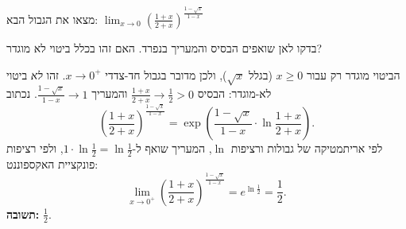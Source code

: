 
\begin{question}
מצאו את הגבול הבא:
$\displaystyle\lim_{x\to0}\left(\frac{1+x}{2+x}\right)^{\frac{1-\sqrt{x}}{1-x}}$
\end{question}

\begin{hint}
בדקו לאן שואפים הבסיס והמעריך בנפרד. האם זהו בכלל ביטוי לא מוגדר?
\end{hint}

\begin{solution}
הביטוי מוגדר רק עבור $x\ge0$ (בגלל $\sqrt x$), ולכן מדובר בגבול חד-צדדי $x\to0^+$.
זהו \emph{לא} ביטוי לא-מוגדר: הבסיס $\frac{1+x}{2+x}\to\frac12>0$ והמעריך $\frac{1-\sqrt x}{1-x}\to1$. נכתוב
\[
\left(\frac{1+x}{2+x}\right)^{\frac{1-\sqrt{x}}{1-x}}=\exp\left(\frac{1-\sqrt{x}}{1-x}\cdot\ln\frac{1+x}{2+x}\right).
\]
לפי אריתמטיקה של גבולות ורציפות $\ln$, המעריך שואף ל-$1\cdot\ln\frac12=\ln\frac12$, ולפי רציפות פונקציית האקספוננט:
\[
\lim_{x\to0^+}\left(\frac{1+x}{2+x}\right)^{\frac{1-\sqrt{x}}{1-x}}=e^{\ln\frac12}=\frac12.
\]
\textbf{תשובה:} $\frac12$.
\end{solution}
